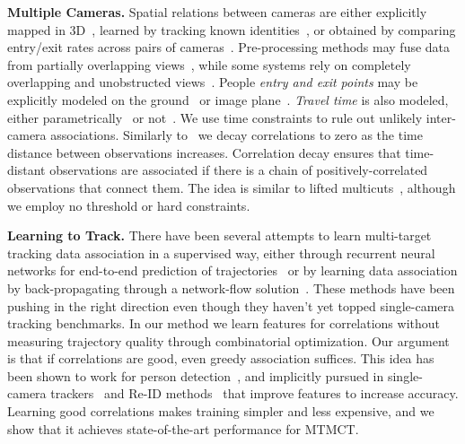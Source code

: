 \documentclass[10pt,twocolumn,letterpaper]{article}
\begin{document}
\noindent\textbf{Multiple Cameras.} Spatial relations between cameras are either explicitly mapped in 3D~\cite{chen_adaptive_2011, zhang_camera_2015}, learned by tracking known identities~\cite{4407431, javed_modeling_2008,jiuqing_distributed_2013}, or obtained by comparing entry/exit rates across pairs of cameras~\cite{cai_exploring_2014, kuo_intercamera_2010,makris_bridging_2004}.
Pre-processing methods may fuse data from partially overlapping views~\cite{zhang_tracking_2015}, while some systems rely on completely overlapping and unobstructed views~\cite{ayazoglu_dynamic_2011, BerclazFTF11,bredereck_data_2012,hamid_player_2010, kamal_information_2013}. People \textit{entry and exit points} may be explicitly modeled on the ground~\cite{cai_exploring_2014,chen_adaptive_2011,kuo_intercamera_2010,makris_bridging_2004} or image plane~\cite{gilbert_tracking_2006,jiuqing_distributed_2013}. 
\textit{Travel time} is also modeled, either parametrically~\cite{jiuqing_distributed_2013, zhang_camera_2015} or not~\cite{chen_adaptive_2011,gilbert_tracking_2006,javed_modeling_2008,kuo_intercamera_2010, makris_bridging_2004}. We use time constraints to rule out unlikely inter-camera associations. Similarly to~\cite{ristani2016performance} we decay correlations to zero as the time distance between observations increases. Correlation decay ensures that time-distant observations are associated if there is a chain of positively-correlated observations that connect them. The idea is similar to lifted multicuts~\cite{tang2017multiple}, although we employ no threshold or hard constraints.

\noindent\textbf{Learning to Track.} There have been several attempts to learn multi-target tracking data association in a supervised way, either through recurrent neural networks for end-to-end prediction of trajectories~\cite{Milan:2017:AAAI_RNNTracking} or by learning data association by back-propagating through a network-flow solution~\cite{DeepFlow}. These methods have been pushing in the right direction even though they haven't yet topped single-camera tracking benchmarks. In our method we learn features for correlations without measuring trajectory quality through combinatorial optimization. Our argument is that if correlations are good, even greedy association suffices. This idea has been shown to work for person detection~\cite{cao2017realtime}, and implicitly pursued in single-camera trackers~\cite{tang2016multi, tang2017multiple, yu2016poi} and Re-ID methods~\cite{hermans2017defense, zheng2016person, zheng2017pedestrian} that improve features to increase accuracy. Learning good correlations makes training simpler and less expensive, and we show that it achieves state-of-the-art performance for MTMCT.
\end{document}
